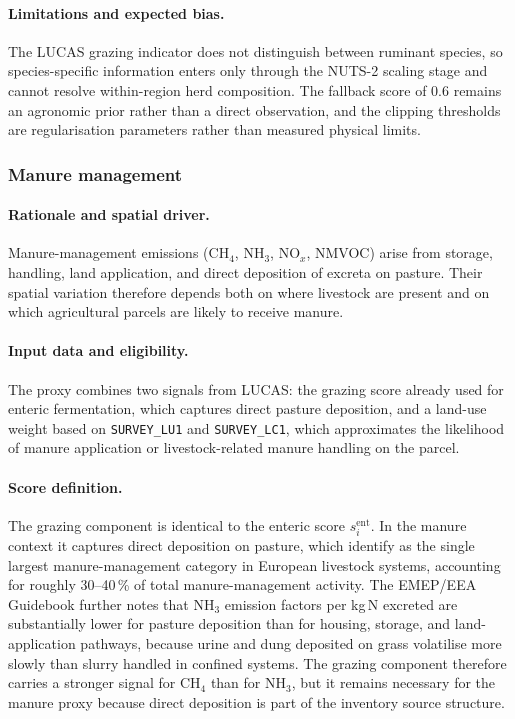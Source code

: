 \paragraph{Limitations and expected bias.}
The LUCAS grazing indicator does not distinguish between ruminant
species, so species-specific information enters only through the NUTS-2
scaling stage and cannot resolve within-region herd composition. The
fallback score of 0.6 remains an agronomic prior rather than a direct
observation, and the clipping thresholds are regularisation parameters
rather than measured physical limits.

\subsubsection{Manure management}
\label{sec:mu-rho-manure}

\paragraph{Rationale and spatial driver.}
Manure-management emissions (CH$_4$, NH$_3$, NO$_x$, NMVOC) arise from
storage, handling, land application, and direct deposition of excreta
on pasture. Their spatial variation therefore depends both on where
livestock are present and on which agricultural parcels are likely to
receive manure.

\paragraph{Input data and eligibility.}
The proxy combines two signals from LUCAS: the grazing score already
used for enteric fermentation, which captures direct pasture
deposition, and a land-use weight based on \texttt{SURVEY\_LU1} and
\texttt{SURVEY\_LC1}, which approximates the likelihood of manure
application or livestock-related manure handling on the parcel.

\paragraph{Score definition.}
The grazing component is identical to the enteric score
$s_i^{\mathrm{ent}}$. In the manure context it captures direct
deposition on pasture, which \citet{oenema_2017} identify as the single
largest manure-management category in European livestock systems,
accounting for roughly 30--40\,\% of total manure-management activity.
The EMEP/EEA Guidebook \citep{EMEP_EEA} further notes that NH$_3$
emission factors per kg\,N excreted are substantially lower for pasture
deposition than for housing, storage, and land-application pathways,
because urine and dung deposited on grass volatilise more slowly than
slurry handled in confined systems. The grazing component therefore
carries a stronger signal for CH$_4$ than for NH$_3$, but it remains
necessary for the manure proxy because direct deposition is part of the
inventory source structure.


